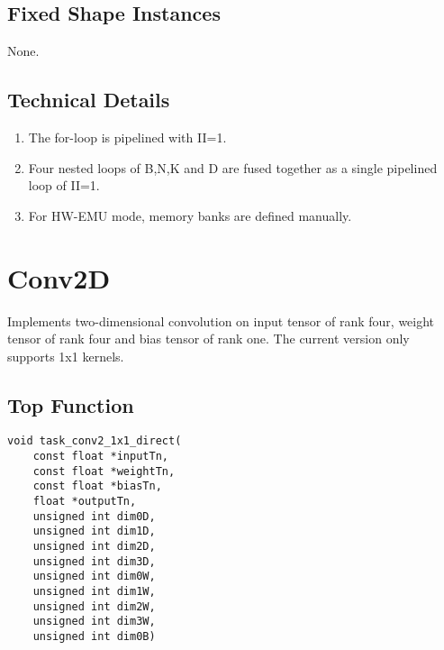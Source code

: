 \documentclass[•]{article}
\begin{document}
\subsection{Fixed Shape Instances}
None.

\subsection{Technical Details}
\begin{enumerate}
\item The for-loop is pipelined with II=1.
\item Four nested loops of B,N,K and D are fused together as a single pipelined loop of II=1.
\item For HW-EMU mode, memory banks are defined manually.
\end{enumerate}










\pagebreak












\section{Conv2D}
Implements two-dimensional convolution on input tensor of rank four, weight tensor of rank four and bias tensor of rank one. The current version only supports 1x1 kernels.

\subsection{Top Function}
\begin{lstlisting}
void task_conv2_1x1_direct(
	const float *inputTn,
	const float *weightTn,
	const float *biasTn,
	float *outputTn,
	unsigned int dim0D,
	unsigned int dim1D,
	unsigned int dim2D,
	unsigned int dim3D,
	unsigned int dim0W,
	unsigned int dim1W,
	unsigned int dim2W,
	unsigned int dim3W,
	unsigned int dim0B)
\end{lstlisting}
\end{document}
